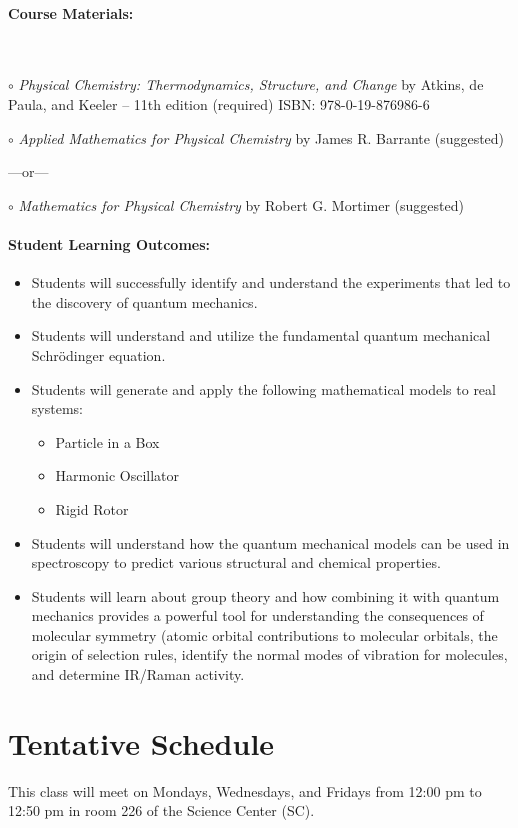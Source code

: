 \documentclass[12pt, letterpaper]{article}
\begin{document}
\paragraph{Course Materials:} ~

$\circ$ \emph{Physical Chemistry: Thermodynamics, Structure, and Change} by Atkins, de Paula, and Keeler -- 11th edition (required) ISBN: 978-0-19-876986-6

$\circ$ \emph{Applied Mathematics for Physical Chemistry} by James R. Barrante (suggested)

\vspace{-4pt}
---or---

\vspace{-4pt}
$\circ$ \emph{Mathematics for Physical Chemistry} by Robert G. Mortimer (suggested)

\paragraph{Student Learning Outcomes:}
\begin{itemize}
  \item{Students will successfully identify and understand the experiments that led to the discovery of quantum mechanics.}
  \item{Students will understand and utilize the fundamental quantum mechanical Schrödinger equation.}
  \item{Students will generate and apply the following mathematical models to real systems:}
  \begin{itemize}
    \item{Particle in a Box}
    \item{Harmonic Oscillator}
    \item{Rigid Rotor}
  \end{itemize}
  \item{Students will understand how the quantum mechanical models can be used in spectroscopy to predict various structural and chemical properties.}
  \item{Students will learn about group theory and how combining it with quantum mechanics provides a powerful tool for understanding the consequences of molecular symmetry (atomic orbital contributions to molecular orbitals, the origin of selection rules, identify the normal modes of vibration for molecules, and determine IR/Raman activity.}
\end{itemize}

\section*{Tentative Schedule}
This class will meet on Mondays, Wednesdays, and Fridays from 12:00 pm to 12:50 pm in room 226 of the Science Center (SC).
\end{document}
